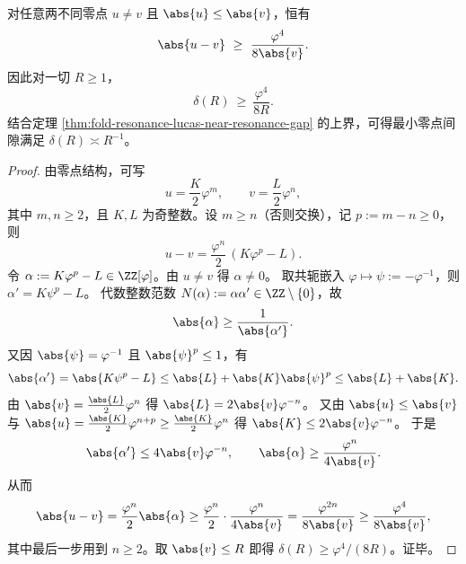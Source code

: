 \begin{proposition}[零点最小间隙的全局下界]\label{prop:fold-resonance-min-gap-global-lower}
对任意两不同零点 \(u\ne v\) 且 \(\abs{u}\le \abs{v}\)，恒有
\[
\abs{u-v}\ \ge\ \frac{\varphi^4}{8\abs{v}}.
\]
因此对一切 \(R\ge 1\)，
\[
\delta(R)\ \ge\ \frac{\varphi^4}{8R}.
\]
结合定理 \ref{thm:fold-resonance-lucas-near-resonance-gap} 的上界，可得最小零点间隙满足 \(\delta(R)\asymp R^{-1}\)。
\end{proposition}

\begin{proof}
由零点结构，可写
\[
u=\frac{K}{2}\varphi^{m},\qquad v=\frac{L}{2}\varphi^{n},
\]
其中 \(m,n\ge 2\)，且 \(K,L\) 为奇整数。设 \(m\ge n\)（否则交换），记 \(p:=m-n\ge 0\)，则
\[
u-v=\frac{\varphi^{n}}{2}\,(K\varphi^{p}-L).
\]
令 \(\alpha:=K\varphi^{p}-L\in\ZZ[\varphi]\)。由 \(u\ne v\) 得 \(\alpha\ne 0\)。
取共轭嵌入 \(\varphi\mapsto\psi:=-\varphi^{-1}\)，则 \(\alpha' = K\psi^{p}-L\)。
代数整数范数 \(N(\alpha):=\alpha\alpha'\in\ZZ\setminus\{0\}\)，故
\[
\abs{\alpha}\ge \frac{1}{\abs{\alpha'}}.
\]
又因 \(\abs{\psi}=\varphi^{-1}\) 且 \(\abs{\psi}^{p}\le 1\)，有
\[
\abs{\alpha'}=\abs{K\psi^{p}-L}\le \abs{L}+\abs{K}\abs{\psi}^{p}\le \abs{L}+\abs{K}.
\]
由 \(\abs{v}=\frac{\abs{L}}{2}\varphi^{n}\) 得 \(\abs{L}=2\abs{v}\varphi^{-n}\)。
又由 \(\abs{u}\le \abs{v}\) 与 \(\abs{u}=\frac{\abs{K}}{2}\varphi^{n+p}\ge \frac{\abs{K}}{2}\varphi^n\) 得 \(\abs{K}\le 2\abs{v}\varphi^{-n}\)。
于是
\[
\abs{\alpha'}\le 4\abs{v}\varphi^{-n},
\qquad
\abs{\alpha}\ge \frac{\varphi^{n}}{4\abs{v}}.
\]
从而
\[
\abs{u-v}
=\frac{\varphi^{n}}{2}\abs{\alpha}
\ge \frac{\varphi^{n}}{2}\cdot\frac{\varphi^{n}}{4\abs{v}}
=\frac{\varphi^{2n}}{8\abs{v}}
\ge \frac{\varphi^4}{8\abs{v}},
\]
其中最后一步用到 \(n\ge 2\)。取 \(\abs{v}\le R\) 即得 \(\delta(R)\ge \varphi^4/(8R)\)。证毕。
\end{proof}
